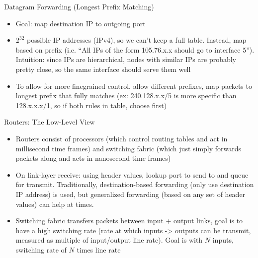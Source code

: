 \documentclass{beamer}
\begin{document}
\begin{frame}[t]{Datagram Forwarding (Longest Prefix Matching)}
    \begin{itemize}
        \item Goal: map destination IP to outgoing port
        \pause\item $2^{32}$ possible IP addresses (IPv4), so we can't keep a full table. Instead, map based on \alert{prefix} (i.e. ``All IPs of the form 105.76.x.x should go to interface 5''). \alert{Intuition}: since IPs are hierarchical, nodes with similar IPs are probably pretty close, so the same interface should serve them well
        \pause\item To allow for more finegrained control, allow different prefixes, map packets to \alert{longest} prefix that fully matches (ex: 240.128.x.x/5 is more specific than 128.x.x.x/1, so if both rules in table, choose first)
    \end{itemize}
\end{frame}

\begin{frame}[t]{Routers: The Low-Level View}
    \begin{itemize}
        \item Routers consist of processors (which control routing tables and act in millisecond time frames) and switching fabric (which just simply forwards packets along and acts in nanosecond time frames)
        \item On link-layer receive: using header values, lookup port to send to and queue for transmit. Traditionally, destination-based forwarding (only use destination IP address) is used, but \alert{generalized forwarding} (based on any set of header values) can help at times.
        \item Switching fabric transfers packets between input + output links, goal is to have a high \alert{switching rate} (rate at which inputs -> outputs can be transmit, measured as multiple of input/output line rate). Goal is with $N$ inputs, switching rate of $N$ times line rate
    \end{itemize}
\end{frame}
\end{document}
